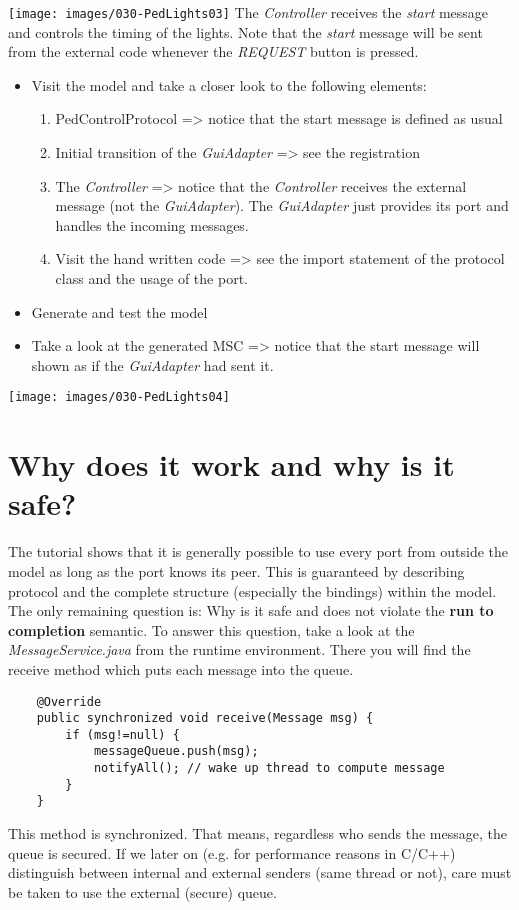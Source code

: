 \texttt{[image: images/030-PedLights03]}
The \textit{Controller} receives the \textit{start} message and controls the timing of the lights. Note that the \textit{start} message will be sent from the external code whenever the \textit{REQUEST} button is pressed.

\begin{itemize}
\item  Visit the model and take a closer look to the following elements:
\begin{enumerate}
\item PedControlProtocol => notice that the start message is defined as usual
\item Initial transition of the \textit{GuiAdapter} => see the registration
\item The \textit{Controller} => notice that the \textit{Controller} receives the external message (not the \textit{GuiAdapter}). The \textit{GuiAdapter} just provides its port and handles the incoming messages.
\item Visit the hand written code => see the import statement of the protocol class and the usage of the port.
\end{enumerate}
\item Generate and test the model
\item Take a look at the generated MSC => notice that the start message will shown as if the \textit{GuiAdapter} had sent it.
\end{itemize}

\texttt{[image: images/030-PedLights04]}

\section{Why does it work and why is it safe?}

The tutorial shows that it is generally possible to use every port from outside the model as long as the port knows its peer. This is guaranteed by describing protocol and the complete structure (especially the bindings) within the model. 
The only remaining question is: Why is it safe and does not violate the \textbf{run to completion} semantic. To answer this question, take a look at the \textit{MessageService.java} from the runtime environment. There you will find the receive method which puts each message into the queue. 

\begin{verbatim}
    @Override
    public synchronized void receive(Message msg) {
        if (msg!=null) {
            messageQueue.push(msg);
            notifyAll(); // wake up thread to compute message
        }
    }
\end{verbatim}

This method is synchronized. That means, regardless who sends the message, the queue is secured. If we later on (e.g. for performance reasons in C/C++) distinguish between internal and external senders (same thread or not), care must be taken to use the external (secure) queue.
